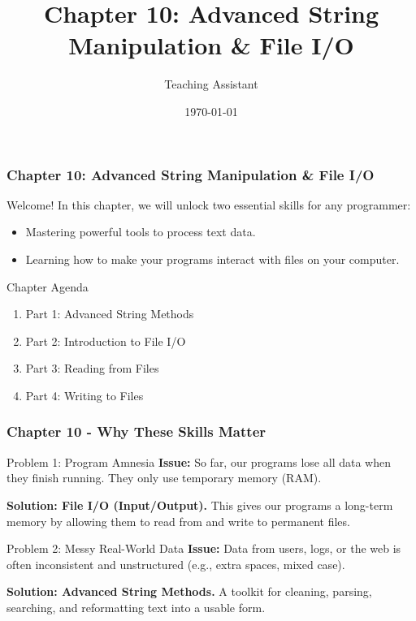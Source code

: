 \documentclass{beamer}
\title{Chapter 10: Advanced String Manipulation \& File I/O}
\author{Teaching Assistant}
\institute{University Name}
\date{\today}
\begin{document}
\frame{\titlepage}

\begin{frame}[fragile]
    \frametitle{Chapter 10: Advanced String Manipulation \& File I/O}
    
    \begin{block}{Welcome!}
        In this chapter, we will unlock two essential skills for any programmer:
        \begin{itemize}
            \item Mastering powerful tools to process text data.
            \item Learning how to make your programs interact with files on your computer.
        \end{itemize}
    \end{block}
    
    \vspace{1em}
    
    \begin{alertblock}{Chapter Agenda}
        \begin{enumerate}
            \item Part 1: Advanced String Methods
            \item Part 2: Introduction to File I/O
            \item Part 3: Reading from Files
            \item Part 4: Writing to Files
        \end{enumerate}
    \end{alertblock}

\end{frame}

\begin{frame}[fragile]
    \frametitle{Chapter 10 - Why These Skills Matter}
    
    \begin{block}{Problem 1: Program Amnesia}
        \textbf{Issue:} So far, our programs lose all data when they finish running. They only use temporary memory (RAM).
        \vspace{0.5em}
        
        \textbf{Solution: File I/O (Input/Output).} This gives our programs a long-term memory by allowing them to read from and write to permanent files.
    \end{block}

    \vspace{1em}
    
    \begin{block}{Problem 2: Messy Real-World Data}
        \textbf{Issue:} Data from users, logs, or the web is often inconsistent and unstructured (e.g., extra spaces, mixed case).
        \vspace{0.5em}
        
        \textbf{Solution: Advanced String Methods.} A toolkit for cleaning, parsing, searching, and reformatting text into a usable form.
    \end{block}
    
\end{frame}
\end{document}
